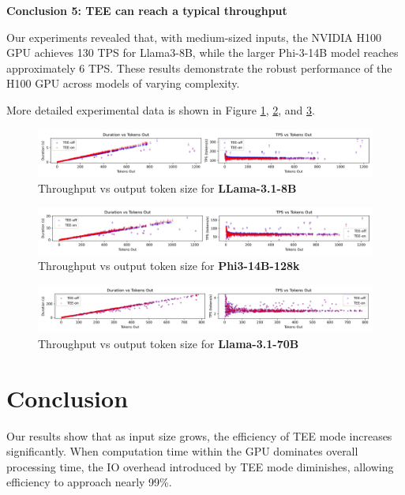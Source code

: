 \documentclass{article}
\begin{document}
\noindent\textbf{Conclusion 5: TEE can reach a typical throughput}

Our experiments revealed that, with medium-sized inputs, the NVIDIA H100 GPU achieves 130 TPS for Llama3-8B, while the larger Phi-3-14B model reaches approximately 6 TPS. These results demonstrate the robust performance of the H100 GPU across models of varying complexity.

More detailed experimental data is shown in Figure \ref{fig:scatter-llama8b}, \ref{fig:scatter-phi14b}, and \ref{fig:scatter-llama70b}.


\begin{figure}
    \centering
    \includegraphics[width=1\linewidth]{scatter-llama8b.png}
    \caption{Throughput vs output token size for \textbf{LLama-3.1-8B}}
    \label{fig:scatter-llama8b}
\end{figure}

\begin{figure}
    \centering
    \includegraphics[width=1\linewidth]{scatter-phi14b.png}
    \caption{Throughput vs output token size for \textbf{Phi3-14B-128k}}
    \label{fig:scatter-phi14b}
\end{figure}

\begin{figure}
    \centering
    \includegraphics[width=1\linewidth]{scatter-llama70b.png}
    \caption{Throughput vs output token size for \textbf{Llama-3.1-70B}}
    \label{fig:scatter-llama70b}
\end{figure}

\section{Conclusion}

Our results show that as input size grows, the efficiency of TEE mode increases significantly. When computation time within the GPU dominates overall processing time, the IO overhead introduced by TEE mode diminishes, allowing efficiency to approach nearly 99\%.
\end{document}
